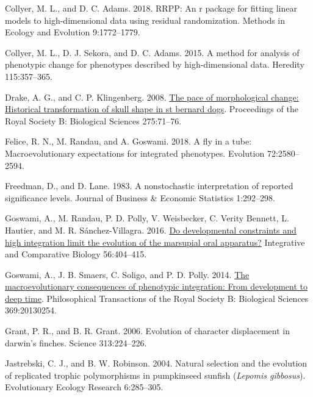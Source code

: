 \documentclass[
  11pt,
]{article}
\newlength{\cslhangindent}
\newlength{\cslentryspacingunit} %
\newenvironment{CSLReferences}[2] %
 {%
  \setlength{\parindent}{0pt}
  \ifodd #1
  \let\oldpar\par
  \def\par{\hangindent=\cslhangindent\oldpar}
  \fi
  \setlength{\parskip}{#2\cslentryspacingunit}
 }%
 {}
\begin{document}
\begin{CSLReferences}{1}{0}
\leavevmode{}%
Collyer, M. L., and D. C. Adams. 2018. RRPP: An r package for fitting
linear models to high-dimensional data using residual randomization.
Methods in Ecology and Evolution 9:1772--1779.

\leavevmode{}%
Collyer, M. L., D. J. Sekora, and D. C. Adams. 2015. A method for
analysis of phenotypic change for phenotypes described by
high-dimensional data. Heredity 115:357--365.

\leavevmode{}%
Drake, A. G., and C. P. Klingenberg. 2008.
\href{https://doi.org/10.1098/rspb.2007.1169}{The pace of morphological
change: Historical transformation of skull shape in st bernard dogs}.
Proceedings of the Royal Society B: Biological Sciences 275:71--76.

\leavevmode{}%
Felice, R. N., M. Randau, and A. Goswami. 2018. A fly in a tube:
Macroevolutionary expectations for integrated phenotypes. Evolution
72:2580--2594.

\leavevmode{}%
Freedman, D., and D. Lane. 1983. A nonstochastic interpretation of
reported significance levels. Journal of Business {\&} Economic
Statistics 1:292--298.

\leavevmode{}%
Goswami, A., M. Randau, P. D. Polly, V. Weisbecker, C. Verity Bennett,
L. Hautier, and M. R. Sánchez-Villagra. 2016.
\href{https://doi.org/10.1093/icb/icw039}{Do developmental constraints
and high integration limit the evolution of the marsupial oral
apparatus?} Integrative and Comparative Biology 56:404--415.

\leavevmode{}%
Goswami, A., J. B. Smaers, C. Soligo, and P. D. Polly. 2014.
\href{https://doi.org/10.1098/rstb.2013.0254}{The macroevolutionary
consequences of phenotypic integration: From development to deep time}.
Philosophical Transactions of the Royal Society B: Biological Sciences
369:20130254.

\leavevmode{}%
Grant, P. R., and B. R. Grant. 2006. Evolution of character displacement
in darwin's finches. Science 313:224--226.

\leavevmode{}%
Jastrebski, C. J., and B. W. Robinson. 2004. Natural selection and the
evolution of replicated trophic polymorphisms in pumpkinseed sunfish
(\emph{{L}epomis gibbosus}). Evolutionary Ecology Research 6:285--305.


\end{CSLReferences}
\end{document}
